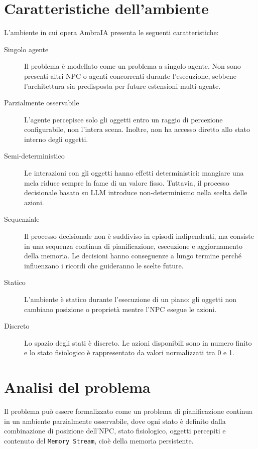 \section{Caratteristiche dell'ambiente}

L'ambiente in cui opera AmbraIA presenta le seguenti caratteristiche:

\begin{description}
	\item[Singolo agente] Il problema è modellato come un problema a singolo agente. Non sono presenti altri NPC o agenti concorrenti durante l'esecuzione, sebbene l'architettura sia predisposta per future estensioni multi-agente.
	
	\item[Parzialmente osservabile] L'agente percepisce solo gli oggetti entro un raggio di percezione configurabile, non l'intera scena. Inoltre, non ha accesso diretto allo stato interno degli oggetti.
	
	\item[Semi-deterministico] Le interazioni con gli oggetti hanno effetti deterministici: mangiare una mela riduce sempre la fame di un valore fisso. Tuttavia, il processo decisionale basato su LLM introduce non-determinismo nella scelta delle azioni.
	
	\item[Sequenziale] Il processo decisionale non è suddiviso in episodi indipendenti, ma consiste in una sequenza continua di pianificazione, esecuzione e aggiornamento della memoria. Le decisioni hanno conseguenze a lungo termine perché influenzano i ricordi che guideranno le scelte future.
	
	\item[Statico] L'ambiente è statico durante l'esecuzione di un piano: gli oggetti non cambiano posizione o proprietà mentre l'NPC esegue le azioni.
	
	\item[Discreto] Lo spazio degli stati è discreto. Le azioni disponibili sono in numero finito e lo stato fisiologico è rappresentato da valori normalizzati tra 0 e 1.
\end{description}

\section{Analisi del problema}

Il problema può essere formalizzato come un problema di pianificazione continua in un ambiente parzialmente osservabile, dove ogni stato è definito dalla combinazione di posizione dell'NPC, stato fisiologico, oggetti percepiti e contenuto del \texttt{Memory Stream}, cioè della memoria persistente.

